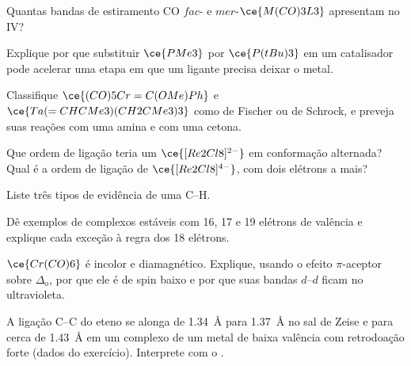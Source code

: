 \begin{exercise}[$\star\star$]\label{exo:b3:organometallic-bonding:5}
Quantas bandas de estiramento CO $fac$- e $mer$-$\ce{M(CO)3L3}$ apresentam no IV?
\end{exercise}

\begin{exercise}[$\star\star$]\label{exo:b3:organometallic-bonding:6}
Explique por que substituir $\ce{PMe3}$ por $\ce{P(tBu)3}$ em um catalisador pode acelerar uma etapa em que um
ligante precisa deixar o metal.
\end{exercise}

\begin{exercise}[$\star\star$]\label{exo:b3:organometallic-bonding:7}
Classifique $\ce{(CO)5Cr=C(OMe)Ph}$ e $\ce{Ta(=CHCMe3)(CH2CMe3)3}$ como  de Fischer ou
de Schrock, e preveja suas reações com uma amina e com uma cetona.
\end{exercise}

\begin{exercise}[$\star\star$]\label{exo:b3:organometallic-bonding:8}
Que ordem de ligação teria um $\ce{[Re2Cl8]^{2-}}$ em conformação alternada? Qual é a ordem de ligação de
$\ce{[Re2Cl8]^{4-}}$, com dois elétrons a mais?
\end{exercise}

\begin{exercise}[$\star\star$]\label{exo:b3:organometallic-bonding:9}
Liste três tipos de evidência de uma  C--H.
\end{exercise}

\begin{exercise}[$\star\star\star$]\label{exo:b3:organometallic-bonding:10}
Dê exemplos de complexos estáveis com 16, 17 e 19 elétrons de valência e explique
cada exceção à regra dos 18 elétrons.
\end{exercise}

\begin{exercise}[$\star\star\star$]\label{exo:b3:organometallic-bonding:11}
$\ce{Cr(CO)6}$ é incolor e diamagnético. Explique, usando o efeito $\pi$-aceptor sobre $\Delta_{\mathrm o}$,
por que ele é de spin baixo e por que suas bandas $d$--$d$ ficam no ultravioleta.
\end{exercise}

\begin{exercise}[$\star\star\star$]\label{exo:b3:organometallic-bonding:12}
A ligação C--C do eteno se alonga de \qty{1.34}{\angstrom} para \qty{1.37}{\angstrom} no sal de Zeise e para
cerca de \qty{1.43}{\angstrom} em um complexo de um metal de baixa valência com retrodoação forte (dados do
exercício). Interprete com o .
\end{exercise}

